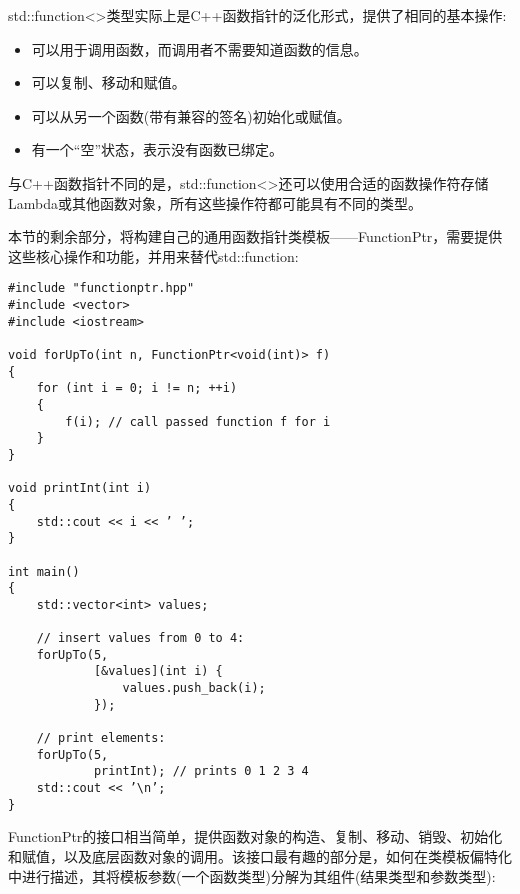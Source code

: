 std::function<>类型实际上是C++函数指针的泛化形式，提供了相同的基本操作:

\begin{itemize}
\item 
可以用于调用函数，而调用者不需要知道函数的信息。

\item 
可以复制、移动和赋值。

\item 
可以从另一个函数(带有兼容的签名)初始化或赋值。

\item 
有一个“空”状态，表示没有函数已绑定。
\end{itemize}

与C++函数指针不同的是，std::function<>还可以使用合适的函数操作符存储Lambda或其他函数对象，所有这些操作符都可能具有不同的类型。

本节的剩余部分，将构建自己的通用函数指针类模板——FunctionPtr，需要提供这些核心操作和功能，并用来替代std::function:

\begin{lstlisting}[style=styleCXX]
#include "functionptr.hpp"
#include <vector>
#include <iostream>

void forUpTo(int n, FunctionPtr<void(int)> f)
{
	for (int i = 0; i != n; ++i)
	{
		f(i); // call passed function f for i
	}
}

void printInt(int i)
{
	std::cout << i << ’ ’;
}

int main()
{
	std::vector<int> values;
	
	// insert values from 0 to 4:
	forUpTo(5,
			[&values](int i) {
				values.push_back(i);
			});
		
	// print elements:
	forUpTo(5,
			printInt); // prints 0 1 2 3 4
	std::cout << ’\n’;
}
\end{lstlisting}

FunctionPtr的接口相当简单，提供函数对象的构造、复制、移动、销毁、初始化和赋值，以及底层函数对象的调用。该接口最有趣的部分是，如何在类模板偏特化中进行描述，其将模板参数(一个函数类型)分解为其组件(结果类型和参数类型):

